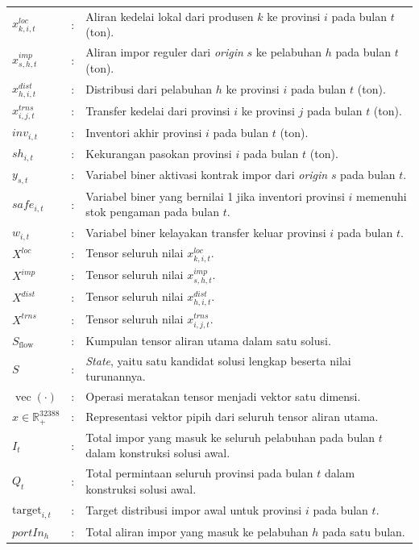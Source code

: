 \documentclass{file/TA-ITS}
\theoremstyle{definition}
\theoremstyle{definition}
\theoremstyle{plain}
\begin{document}
\begin{flushleft}
\begin{longtable}{@{}p{}p{}p{}@{}}
$x^{loc}_{k,i,t}$ &:& Aliran kedelai lokal dari produsen $k$ ke provinsi $i$ pada bulan $t$ (ton). \\
$x^{imp}_{s,h,t}$ &:& Aliran impor reguler dari \textit{origin} $s$ ke pelabuhan $h$ pada bulan $t$ (ton). \\
$x^{dist}_{h,i,t}$ &:& Distribusi dari pelabuhan $h$ ke provinsi $i$ pada bulan $t$ (ton). \\
$x^{trns}_{i,j,t}$ &:& Transfer kedelai dari provinsi $i$ ke provinsi $j$ pada bulan $t$ (ton). \\
$inv_{i,t}$ &:& Inventori akhir provinsi $i$ pada bulan $t$ (ton). \\
$sh_{i,t}$ &:& Kekurangan pasokan provinsi $i$ pada bulan $t$ (ton). \\
$y_{s,t}$ &:& Variabel biner aktivasi kontrak impor dari \textit{origin} $s$ pada bulan $t$. \\
$safe_{i,t}$ &:& Variabel biner yang bernilai 1 jika inventori provinsi $i$ memenuhi stok pengaman pada bulan $t$. \\
$w_{i,t}$ &:& Variabel biner kelayakan transfer keluar provinsi $i$ pada bulan $t$. \\
$X^{loc}$ &:& Tensor seluruh nilai $x^{loc}_{k,i,t}$. \\
$X^{imp}$ &:& Tensor seluruh nilai $x^{imp}_{s,h,t}$. \\
$X^{dist}$ &:& Tensor seluruh nilai $x^{dist}_{h,i,t}$. \\
$X^{trns}$ &:& Tensor seluruh nilai $x^{trns}_{i,j,t}$. \\
$S_{\text{flow}}$ &:& Kumpulan tensor aliran utama dalam satu solusi. \\
$S$ &:& \textit{State}, yaitu satu kandidat solusi lengkap beserta nilai turunannya. \\
$\operatorname{vec}(\cdot)$ &:& Operasi meratakan tensor menjadi vektor satu dimensi. \\
$x \in \mathbb{R}^{32388}_{+}$ &:& Representasi vektor pipih dari seluruh tensor aliran utama. \\
$I_t$ &:& Total impor yang masuk ke seluruh pelabuhan pada bulan $t$ dalam konstruksi solusi awal. \\
$Q_t$ &:& Total permintaan seluruh provinsi pada bulan $t$ dalam konstruksi solusi awal. \\
$\mathrm{target}_{i,t}$ &:& Target distribusi impor awal untuk provinsi $i$ pada bulan $t$. \\
$portIn_h$ &:& Total aliran impor yang masuk ke pelabuhan $h$ pada satu bulan. \\

\end{longtable}
\end{flushleft}
\end{document}
